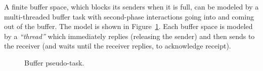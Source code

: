 \documentclass[11pt]{article}
\begin{document}
A finite buffer space, which blocks its senders when it is full, can
be modeled by a multi-threaded buffer task with second-phase
interactions going into and coming out of the buffer.  The model is
shown in Figure~\ref{fig:finite-buffers}.  Each buffer space is
modeled by a \emph{``thread''} which immediately replies (releasing the sender)
and then sends to the receiver (and waits until the receiver replies,
to acknowledge receipt).

\begin{figure}[htbp]
  \centering
  \caption{Buffer pseudo-task.} 
  \label{fig:finite-buffers}
\end{figure}
\end{document}
